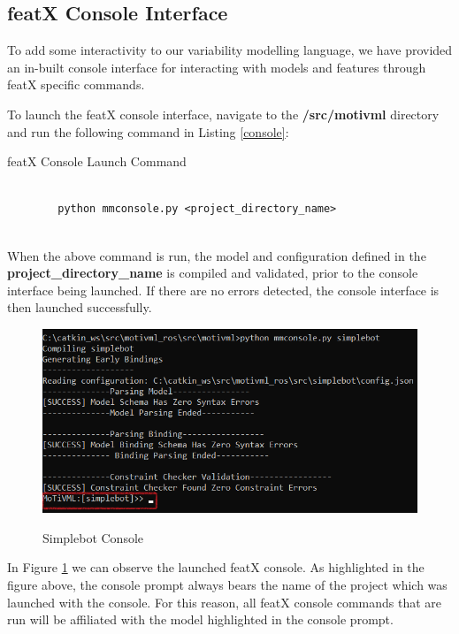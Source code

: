 \documentclass{article}
\newenvironment{longlisting}{\captionsetup{type=listing}}{}
\begin{document}
\subsection{featX Console Interface}
To add some interactivity to our variability modelling language, we have provided an in-built console interface for interacting with models and features through featX specific commands.

To launch the featX console interface, navigate to the \textbf{/src/motivml} directory and run the following command in Listing \ref{console}:

\begin{longlisting}
	\caption{featX Console Launch Command}
	\begin{verbatim}
		
		python mmconsole.py <project_directory_name>
		
	\end{verbatim}
	\label{console}
\end{longlisting}

When the above command is run, the model and configuration defined in the \textbf{project\_directory\_name} is compiled and validated, prior to the console interface being launched. If there are no errors detected, the console interface is then launched successfully. 

\begin{figure}[H]
	\caption{Simplebot Console}
	\centering
	\includegraphics[width=0.7\columnwidth]{images/console.png}
	\label{consolelaunch}
\end{figure}

In Figure \ref{consolelaunch} we can observe the launched featX console. As highlighted in the figure above, the console prompt always bears the name of the project which was launched with the console. For this reason, all featX console commands that are run will be affiliated with the model highlighted in the console prompt.
\end{document}
